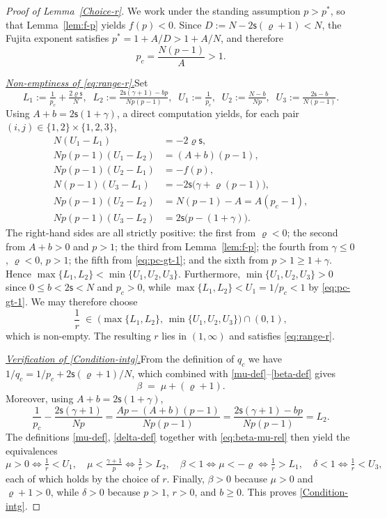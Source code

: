 \documentclass[12pt,reqno]{amsart}
\theoremstyle{plain}
\theoremstyle{definition}
\theoremstyle{remark}
\numberwithin{equation}{section}
\newcommand{\ts}{\mathsf{s}}
\begin{document}
\begin{proof}[Proof of Lemma~\ref{Choice-r}]
We work under the standing assumption $p>p^{*}$, so that Lemma~\ref{lem:f-p} yields $f(p)<0$. Since $D:=N-2\ts(\varrho+1)<N$, the Fujita exponent satisfies $p^{*}=1+A/D>1+A/N$, and therefore
\begin{equation}\label{eq:pc-gt-1}
p_{c}=\frac{N(p-1)}{A}>1.
\end{equation}

\textit{\underline{Non-emptiness of \eqref{eq:range-r}.}}\quad Set
\[
L_{1}:=\tfrac{1}{p_{c}}+\tfrac{2\varrho\ts}{N},\;\;
L_{2}:=\tfrac{2\ts(\gamma+1)-bp}{Np(p-1)},\;\;
U_{1}:=\tfrac{1}{p_{c}},\;\;
U_{2}:=\tfrac{N-b}{Np},\;\;
U_{3}:=\tfrac{2\ts-b}{N(p-1)}.
\]
Using $A+b=2\ts(1+\gamma)$, a direct computation yields, for each pair $(i,j)\in\{1,2\}\times\{1,2,3\}$,
\begin{align*}
N(U_{1}-L_{1}) &= -2\varrho\ts,\\
Np(p-1)(U_{1}-L_{2}) &= (A+b)(p-1),\\
Np(p-1)(U_{2}-L_{1}) &= -f(p),\\
N(p-1)(U_{3}-L_{1}) &= -2\ts\bigl(\gamma+\varrho(p-1)\bigr),\\
Np(p-1)(U_{2}-L_{2}) &= N(p-1)-A = A(p_{c}-1),\\
Np(p-1)(U_{3}-L_{2}) &= 2\ts\bigl(p-(1+\gamma)\bigr).
\end{align*}
The right-hand sides are all strictly positive: the first from $\varrho<0$; the second from $A+b>0$ and $p>1$; the third from Lemma~\ref{lem:f-p}; the fourth from $\gamma\leq 0$, $\varrho<0$, $p>1$; the fifth from \eqref{eq:pc-gt-1}; and the sixth from $p>1\geq 1+\gamma$. Hence $\max\{L_{1},L_{2}\}<\min\{U_{1},U_{2},U_{3}\}$. Furthermore, $\min\{U_{1},U_{2},U_{3}\}>0$ since $0\leq b<2\ts<N$ and $p_{c}>0$, while $\max\{L_{1},L_{2}\}<U_{1}=1/p_{c}<1$ by \eqref{eq:pc-gt-1}. We may therefore choose
\[
\frac{1}{r}\;\in\;\bigl(\max\{L_{1},L_{2}\},\,\min\{U_{1},U_{2},U_{3}\}\bigr)\cap(0,1),
\]
which is non-empty. The resulting $r$ lies in $(1,\infty)$ and satisfies \eqref{eq:range-r}.

\textit{\underline{Verification of \eqref{Condition-intg}.}}\quad From the definition of $q_{c}$ we have $1/q_{c}=1/p_{c}+2\ts(\varrho+1)/N$, which combined with \eqref{mu-def}--\eqref{beta-def} gives
\begin{equation}\label{eq:beta-mu-rel}
\beta\;=\;\mu+(\varrho+1).
\end{equation}
Moreover, using $A+b=2\ts(1+\gamma)$,
\[
\frac{1}{p_{c}}-\frac{2\ts(\gamma+1)}{Np}
=\frac{Ap-(A+b)(p-1)}{Np(p-1)}
=\frac{2\ts(\gamma+1)-bp}{Np(p-1)}=L_{2}.
\]
The definitions \eqref{mu-def}, \eqref{delta-def} together with \eqref{eq:beta-mu-rel} then yield the equivalences
\[
\mu>0\Leftrightarrow \tfrac{1}{r}<U_{1},\quad
\mu<\tfrac{\gamma+1}{p}\Leftrightarrow \tfrac{1}{r}>L_{2},\quad
\beta<1\Leftrightarrow\mu<-\varrho\Leftrightarrow \tfrac{1}{r}>L_{1},\quad
\delta<1\Leftrightarrow \tfrac{1}{r}<U_{3},
\]
each of which holds by the choice of $r$. Finally, $\beta>0$ because $\mu>0$ and $\varrho+1>0$, while $\delta>0$ because $p>1$, $r>0$, and $b\geq 0$. This proves \eqref{Condition-intg}.


\end{proof}
\end{document}
